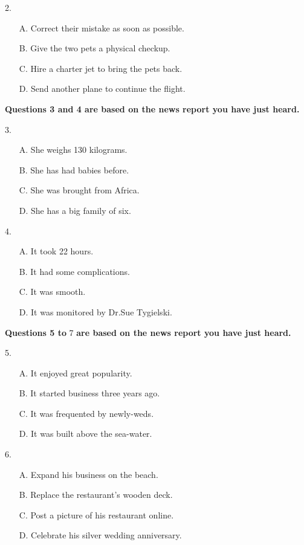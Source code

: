 \documentclass[UTF8,11pt]{ctexart}
\begin{document}
2.


\begin{itemize}[leftmargin=2em,itemsep=.2em,topsep=.4em]\item[A.] Correct their mistake as soon as possible.
\item[B.] Give the two pets a physical checkup.
\item[C.] Hire a charter jet to bring the pets back.
\item[D.] Send another plane to continue the flight.
\end{itemize}

\textbf{Questions 3 and 4 are based on the news report you have just heard.}


3.


\begin{itemize}[leftmargin=2em,itemsep=.2em,topsep=.4em]\item[A.] She weighs 130 kilograms.
\item[B.] She has had babies before.
\item[C.] She was brought from Africa.
\item[D.] She has a big family of six.
\end{itemize}

4.


\begin{itemize}[leftmargin=2em,itemsep=.2em,topsep=.4em]\item[A.] It took 22 hours.
\item[B.] It had some complications.
\item[C.] It was smooth.
\item[D.] It was monitored by Dr.Sue Tygielski.
\end{itemize}

\textbf{Questions 5 to }7 \textbf{are based on the news report you have just heard.}


5.


\begin{itemize}[leftmargin=2em,itemsep=.2em,topsep=.4em]\item[A.] It enjoyed great popularity.
\item[B.] It started business three years ago.
\item[C.] It was frequented by newly-weds.
\item[D.] It was built above the sea-water.
\end{itemize}

6.


\begin{itemize}[leftmargin=2em,itemsep=.2em,topsep=.4em]\item[A.] Expand his business on the beach.
\item[B.] Replace the restaurant's wooden deck.
\item[C.] Post a picture of his restaurant online.
\item[D.] Celebrate his silver wedding anniversary.
\end{itemize}
\end{document}
